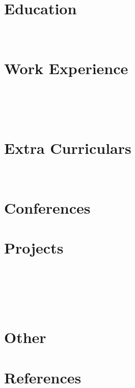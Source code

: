 \documentclass[a4paper,11pt]{article}
\begin{document}
\pagestyle{empty}



\section{Education}
 \\[-18pt]

\section{Work Experience}
 \\[5pt]
 \\[5pt]
 \\[5pt]

% 

\section{Extra Curriculars}
 \\[5pt]



\section{Conferences}



\newpage

\section{Projects}
 \\[5pt]
 \\[5pt]
 \\[5pt]
 \\[5pt]


% 
% 
% 
% 

% 

\section{Other}


\section{References}

\end{document}
